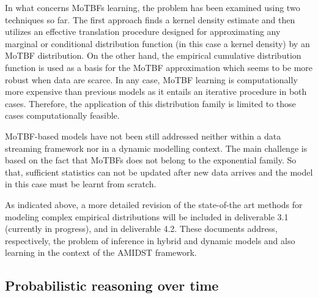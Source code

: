 In what concerns MoTBFs learning, the problem has been examined using two techniques so far. The first approach finds a kernel density estimate and then utilizes an effective translation procedure designed for approximating any marginal or conditional distribution function (in this case a kernel density) by an MoTBF distribution. On the other hand, the empirical cumulative distribution function is used as a basis for the MoTBF approximation which seems to be more robust when data are scarce. In any case, MoTBF learning is computationally more expensive than previous models as it entails an iterative procedure in both cases. Therefore, the application of this distribution family is limited to those cases computationally feasible.

MoTBF-based models have not been still addressed neither within a data streaming framework nor in a dynamic modelling context. The main challenge is based on the fact that MoTBFs does not belong to the exponential family. So that, sufficient statistics can not be updated after new data arrives and the model in this case must be learnt from scratch. 

As indicated above, a more detailed revision of the state-of-the art methods for modeling complex empirical distributions will be included in deliverable 3.1 (currently in progress), and in deliverable 4.2. These documents address, respectively, the problem of inference in hybrid and dynamic models and also learning in the context of the AMIDST framework.




\subsection{Probabilistic reasoning over time}\label{SubSection:DBNs}

